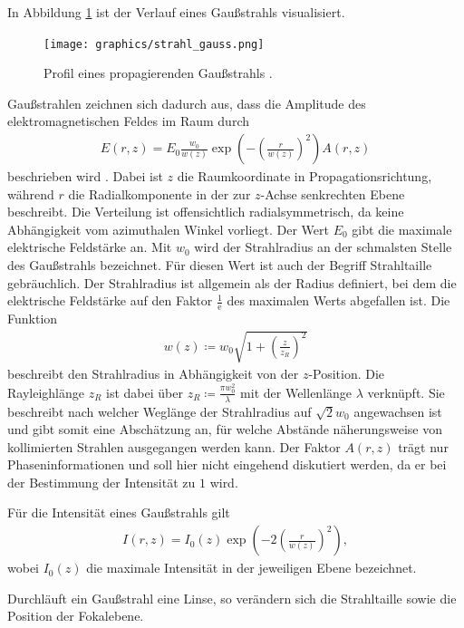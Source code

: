 \documentclass[
class=book,
accentcolor=1b,
custommargins=geometry,
fontsize=11pt,
thesis={type=Versuchsanleitung},
ruledheaders=all,
headline=false,
instbox=false,
marginpar=false,
title=small,
ignore-missing-data=true,
twoside=false,
pdfa=false %
]{apqpub}
\begin{document}
In Abbildung \ref{fig:gauss} ist der Verlauf eines Gaußstrahls visualisiert.
\begin{figure}[H]
\centering
	\texttt{[image: graphics/strahl\_gauss.png]}
\caption{Profil eines propagierenden Gaußstrahls \protect\cite{gauss}.}
\label{fig:gauss}
\end{figure}
Gaußstrahlen zeichnen sich dadurch aus, dass die Amplitude des elektromagnetischen Feldes im Raum durch 
\begin{align*}
E \left (r, z\right) = E_0 \frac{w_0}{w\left( z \right)} 
\exp \left( - \left( \frac{r}{w \left( z \right)} \right)^2 \right) 
A \left( r, z \right)
\end{align*}
beschrieben wird \cite[S. 50 -- 52]{Meschede}.
Dabei ist $z$ die Raumkoordinate in Propagationsrichtung, während $r$ die Radialkomponente in der zur $z$-Achse senkrechten Ebene beschreibt.
Die Verteilung ist offensichtlich radialsymmetrisch, da keine Abhängigkeit vom azimuthalen Winkel vorliegt.
Der Wert $E_0$ gibt die maximale elektrische Feldstärke an.
Mit $w_0$ wird der Strahlradius an der schmalsten Stelle des Gaußstrahls bezeichnet.
Für diesen Wert ist auch der Begriff Strahltaille gebräuchlich. 
Der Strahlradius ist allgemein als der Radius definiert, bei dem die elektrische Feldstärke auf den Faktor $\frac{1}{\mathrm{e}}$ des maximalen Werts abgefallen ist.
Die Funktion 
\begin{align*}
w \left( z \right) \coloneqq w_0 \sqrt{1+\left(\frac{z}{z_R}\right)^2}
\end{align*}
beschreibt den Strahlradius in Abhängigkeit von der $z$-Position.
Die Rayleighlänge $z_R$ ist dabei über $z_R \coloneqq \frac{\pi w_0^2}{\lambda}$ mit der Wellenlänge $\lambda$ verknüpft.
Sie beschreibt nach welcher Weglänge der Strahlradius auf $\sqrt{2} w_0$ angewachsen ist und gibt somit eine Abschätzung an, für welche Abstände näherungsweise von kollimierten Strahlen ausgegangen werden kann.
Der Faktor $A\left( r, z \right)$ trägt nur Phaseninformationen und soll hier nicht eingehend diskutiert werden, da er bei der Bestimmung der Intensität zu $1$ wird.

Für die Intensität eines Gaußstrahls gilt
\begin{align*}
I \left (r, z\right) = I_0 (z)
\exp \left( - 2 \left( \frac{r}{w \left( z \right)} \right)^2 \right) ,
\end{align*}
wobei $I_0 \left(z\right)$ die maximale Intensität in der jeweiligen Ebene bezeichnet.

Durchläuft ein Gaußstrahl eine Linse, so verändern sich die Strahltaille sowie die Position der Fokalebene.
\end{document}
